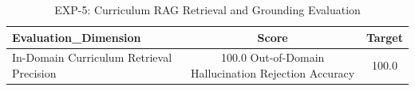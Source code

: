 \begin{table}[htbp]
\centering
\caption{EXP-5: Curriculum RAG Retrieval and Grounding Evaluation}
\label{tab:exp5_rag_evaluation}
\begin{tabular}{lcc}
\toprule
Evaluation\_Dimension & Score & Target \\
\midrule
In-Domain Curriculum Retrieval Precision & 100.0%
Out-of-Domain Hallucination Rejection Accuracy & 100.0%
\bottomrule
\end{tabular}
\end{table}
